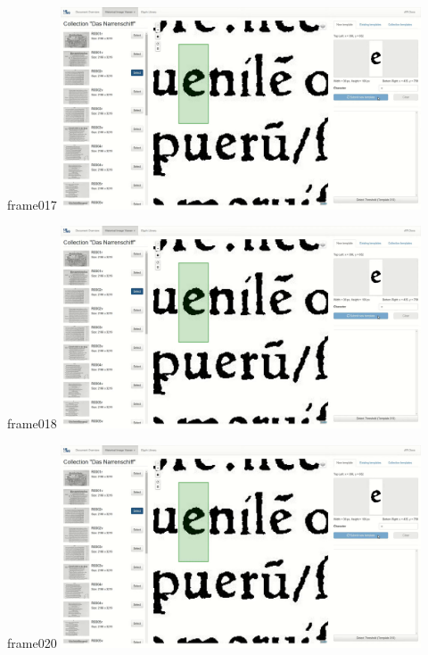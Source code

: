 \documentclass{beamer}
\begin{document}
\begin{frame}{frame017}
\includegraphics[width=0.8\textwidth]{output/exported-frames/frame017.png}
\note{}
\end{frame}

\begin{frame}{frame018}
\includegraphics[width=0.8\textwidth]{output/exported-frames/frame018.png}
\note{}
\end{frame}

\begin{frame}{frame020}
\includegraphics[width=0.8\textwidth]{output/exported-frames/frame020.png}
\note{}
\end{frame}
\end{document}
